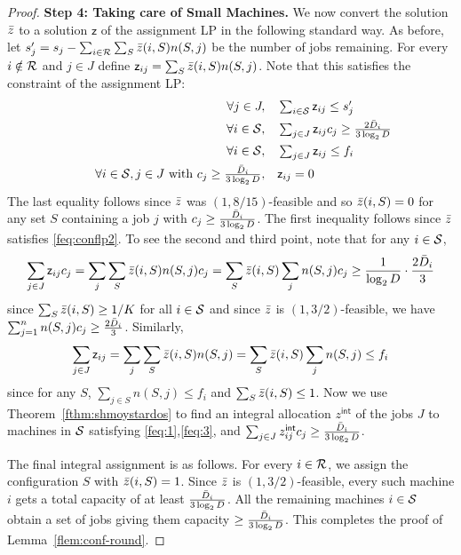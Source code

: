 \begin{proof}
\noindent
{\bf Step 4: Taking care of Small Machines.}
\def\zz{z^{\mathsf{int}}}
\def\2z{\mathsf z}
We now convert the solution $\bar z$  to a solution $\2z$ of the assignment LP in the following standard way.
As before, let $s'_j = s_j - \sum_{i\in {\cal R}}\sum_S \bar z(i,S)n(S,j)$ be the number of jobs remaining.
For every $i\notin {\cal R}$ and $j\in J$ define $\2z_{ij} = \sum_{S}\z(i,S)n(S,j)$.  Note that this satisfies the constraint of the assignment LP:
	\begin{alignat}{4}
		&& \quad \forall j \in J,   &\quad  \textstyle \sum_{i\in \calS} \2z_{ij}  \leq  s'_j \label{feq:1} \\
		&& \quad \forall i\in \calS ,      &\quad  \textstyle \sum_{j\in J}  \2z_{ij}c_j \geq \frac{2\barD_i}{3\log_2 D} \label{feq:2} \\
	&& \quad \forall i\in \calS ,      &\quad  \textstyle \sum_{j\in J}  \2z_{ij} \leq f_i \label{feq:3} \\
		&& \quad \forall i\in \calS, j\in J~\textrm{with}~ \textstyle c_j \geq \frac{\barD_i}{3\log_2 D}, & \quad \2z_{ij}   =  0  \label{feq:4}
	\end{alignat}
	The last equality follows since $\bar z$ was $(1,8/15)$-feasible and so $\bar z(i,S) = 0$ for any set $S$ containing a job $j$ with $c_j \geq \frac{\bar{D}_i}{3\log_2 D}$.
The first inequality follows  since $\bar z$ satisfies \eqref{feq:conflp2}. To see the second and third point, note
that for any $i\in {\cal S}$,
\[
\sum_{j\in J} \2z_{ij}c_j = \sum_j \sum_S \z(i,S)n(S,j)c_j = \sum_S \z(i,S) \sum_j n(S,j)c_j \geq \frac{1}{\log_2 D}\cdot \frac{2\barD_i}{3}
\]
	since $\sum_S \bar z(i,S) \geq 1/K$ for all $i\in {\cal S}$ and since $\bar z$ is $(1,3/2)$-feasible, we have $\sum_{j=1}^n n(S,j) c_j \geq \frac{2\bar{D}_i}{3}$. Similarly,
\[
\sum_{j\in J} \2z_{ij} = \sum_j \sum_S \z(i,S)n(S,j) = \sum_S \z(i,S) \sum_j n(S,j) \leq f_i
\]
since for any $S$, $\sum_{j\in S} n(S,j) \leq f_i$ and $\sum_S \bar z(i,S) \leq 1$.
Now we use Theorem~\ref{fthm:shmoystardos} to find an integral allocation $\zz$ of the jobs $J$ to machines in ${\cal S}$ satisfying \eqref{feq:1},\eqref{feq:3}, and $\sum_{j\in J} \zz_{ij}c_j \geq \frac{\barD_i}{3
\log_2 D}$. \medskip

The final integral assignment is as follows. For every $i\in {\cal R}$, we assign the configuration $S$ with $\bar z(i,S) = 1$.
Since $\bar z$ is $(1,3/2)$-feasible, every such machine $i$ gets a total capacity of at least $\frac{\bar{D}_i}{3\log_2 D}$. %
All the remaining machines $i\in {\cal S}$ obtain a set of jobs giving them capacity $\geq \frac{\bar{D}_i}{3\log_2 D}$. %
This completes the proof of Lemma~\ref{flem:conf-round}.
\end{proof}

